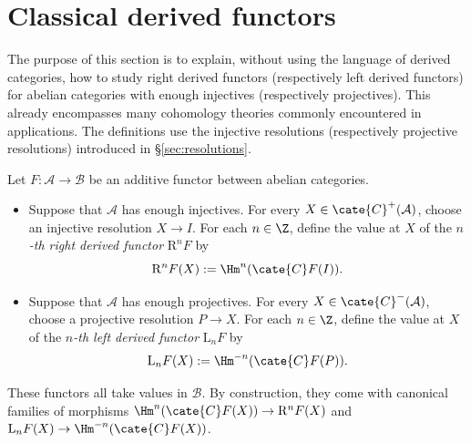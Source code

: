 
\section{Classical derived functors}\label{sec:derived-primer}
\hypertarget{o014.aljabr2.chapter3.classical-derived-functors}{ }

The purpose of this section is to explain, without using the language of
derived categories, how to study right derived functors (respectively left
derived functors) for abelian categories with enough injectives (respectively
projectives). This already encompasses many cohomology theories commonly
encountered in applications. The definitions use the injective resolutions
(respectively projective resolutions) introduced in \S\ref{sec:resolutions}.

\begin{definition}\label{def:derived-primer}
	Let $F:\mathcal{A}\to\mathcal{B}$ be an additive functor between abelian
	categories.
	\begin{itemize}
		\item Suppose that $\mathcal{A}$ has enough injectives. For every
		$X\in\cate{C}^+(\mathcal{A})$, choose an injective resolution
		$X\to I$. For each $n\in\Z$, define the value at $X$ of the
		\emph{$n$-th right derived functor} $\mathrm{R}^nF$ by
		\[ \mathrm{R}^n F(X) := \Hm^n(\cate{C}F(I)). \]
		\item Suppose that $\mathcal{A}$ has enough projectives. For every
		$X\in\cate{C}^-(\mathcal{A})$, choose a projective resolution
		$P\to X$. For each $n\in\Z$, define the value at $X$ of the
		\emph{$n$-th left derived functor} $\mathrm{L}_nF$ by
		\[ \mathrm{L}_n F(X) := \Hm^{-n}(\cate{C}F(P)). \]
	\end{itemize}
	These functors all take values in $\mathcal{B}$. By construction, they come
	with canonical families of morphisms
	$\Hm^n(\cate{C}F(X))\to\mathrm{R}^nF(X)$ and
	$\mathrm{L}_nF(X)\to\Hm^{-n}(\cate{C}F(X))$.
\end{definition}

